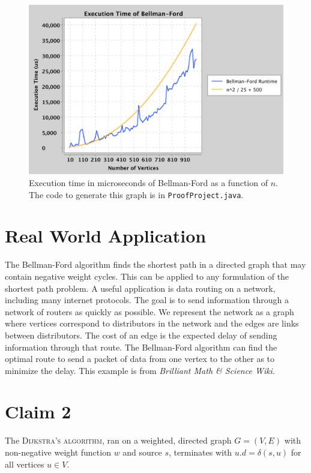 \documentclass[12pt]{article}
\begin{document}
\begin{figure}[h]
  \centering
    \includegraphics[scale=.5]{figures/runtime.png}
        \caption{Execution time in microseconds of Bellman-Ford as a function of $n$. The code to generate this graph is in \texttt{ProofProject.java}.}
\end{figure}

\clearpage
\section*{Real World Application} 
The Bellman-Ford algorithm finds the shortest path in a directed graph that may contain negative weight cycles. This can be applied to any formulation of the shortest path problem. A useful application is data routing on a network, including many internet protocols. The goal is to send information through a network of routers as quickly as possible. We represent the network as a graph where vertices correspond to distributors in the network and the edges are links between distributors. The cost of an edge is the expected delay of sending information through that route. The Bellman-Ford algorithm can find the optimal route to send a packet of data from one vertex to the other as to minimize the delay. This example is from \textit{Brilliant Math \& Science Wiki}\cite{brilliant}.



\newpage
\section*{Claim 2}
The \textsc{Dijkstra’s algorithm}, ran on a weighted, directed graph
$G = (V,E)$ with non-negative weight function $w$ and source $s$, terminates with $u.d = \delta(s, u)$
for all vertices $u \in V$.
\end{document}
